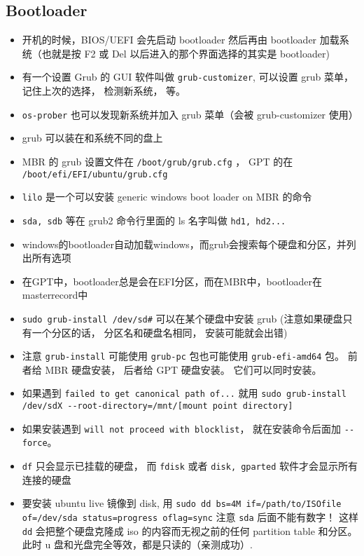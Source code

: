 \subsection{Bootloader}
\begin{itemize}
\item 开机的时候，BIOS/UEFI 会先启动 bootloader 然后再由 bootloader 加载系统（也就是按 F2 或 Del 以后进入的那个界面选择的其实是 bootloader)
\item 有一个设置 Grub 的 GUI 软件叫做 \verb`grub-customizer`, 可以设置 grub 菜单， 记住上次的选择， 检测新系统， 等。
\item \verb`os-prober` 也可以发现新系统并加入 grub 菜单（会被 grub-customizer 使用）
\item grub 可以装在和系统不同的盘上
\item MBR 的 grub 设置文件在 \verb`/boot/grub/grub.cfg` ， GPT 的在 \verb`/boot/efi/EFI/ubuntu/grub.cfg`
\item \verb`lilo` 是一个可以安装 generic windows boot loader on MBR 的命令
\item \verb`sda, sdb` 等在 grub2 命令行里面的 ls 名字叫做 \verb`hd1, hd2...`
\item windows的bootloader自动加载windows，而grub会搜索每个硬盘和分区，并列出所有选项
\item 在GPT中，bootloader总是会在EFI分区，而在MBR中，bootloader在masterrecord中
\item \verb`sudo grub-install /dev/sd#` 可以在某个硬盘中安装 grub (注意如果硬盘只有一个分区的话， 分区名和硬盘名相同， 安装可能就会出错)
\item 注意 \verb`grub-install` 可能使用 \verb`grub-pc` 包也可能使用 \verb`grub-efi-amd64` 包。 前者给 MBR 硬盘安装， 后者给 GPT 硬盘安装。 它们可以同时安装。
\item 如果遇到 \verb`failed to get canonical path of...` 就用 \verb`sudo grub-install /dev/sdX --root-directory=/mnt/[mount point directory]`
\item 如果安装遇到 \verb`will not proceed with blocklist`， 就在安装命令后面加 \verb`--force`。
\item \verb`df` 只会显示已挂载的硬盘， 而 \verb`fdisk` 或者 \verb`disk, gparted` 软件才会显示所有连接的硬盘
\item 要安装 ubuntu live 镜像到 disk, 用 \verb`sudo dd bs=4M if=/path/to/ISOfile of=/dev/sda status=progress oflag=sync` 注意 \verb`sda` 后面不能有数字！ 这样 \verb`dd` 会把整个硬盘克隆成 iso 的内容而无视之前的任何 partition table 和分区。 此时 u 盘和光盘完全等效，都是只读的（亲测成功）.
\end{itemize}

